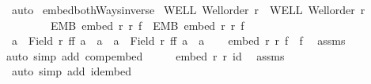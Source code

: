 \begin{isabellebody}
\ auto\isanewline
{}\isamarkupfalse%
%
\endisatagproof
{\isafoldproof}%
%
\isadelimproof
\isanewline
%
\endisadelimproof
\isanewline
{}\isamarkupfalse%
\ embed{\isacharunderscore}{\kern0pt}bothWays{\isacharunderscore}{\kern0pt}inverse{\isacharcolon}{\kern0pt}\isanewline
{}\ WELL{\isacharcolon}{\kern0pt}\ {\isachardoublequoteopen}Well{\isacharunderscore}{\kern0pt}order\ r{\isachardoublequoteclose}\ \ WELL{\isacharprime}{\kern0pt}{\isacharcolon}{\kern0pt}\ {\isachardoublequoteopen}Well{\isacharunderscore}{\kern0pt}order\ r{\isacharprime}{\kern0pt}{\isachardoublequoteclose}\ \isanewline
\ \ \ \ \ \ \ \ EMB{\isacharcolon}{\kern0pt}\ {\isachardoublequoteopen}embed\ r\ r{\isacharprime}{\kern0pt}\ f{\isachardoublequoteclose}\ \ EMB{\isacharprime}{\kern0pt}{\isacharcolon}{\kern0pt}\ {\isachardoublequoteopen}embed\ r{\isacharprime}{\kern0pt}\ r\ f{\isacharprime}{\kern0pt}{\isachardoublequoteclose}\isanewline
{}\ {\isachardoublequoteopen}{\isacharparenleft}{\kern0pt}{\isasymforall}a\ {\isasymin}\ Field\ r{\isachardot}{\kern0pt}\ f{\isacharprime}{\kern0pt}{\isacharparenleft}{\kern0pt}f\ a{\isacharparenright}{\kern0pt}\ {\isacharequal}{\kern0pt}\ a{\isacharparenright}{\kern0pt}\ {\isasymand}\ {\isacharparenleft}{\kern0pt}{\isasymforall}a{\isacharprime}{\kern0pt}\ {\isasymin}\ Field\ r{\isacharprime}{\kern0pt}{\isachardot}{\kern0pt}\ f{\isacharparenleft}{\kern0pt}f{\isacharprime}{\kern0pt}\ a{\isacharprime}{\kern0pt}{\isacharparenright}{\kern0pt}\ {\isacharequal}{\kern0pt}\ a{\isacharprime}{\kern0pt}{\isacharparenright}{\kern0pt}{\isachardoublequoteclose}\isanewline
%
\isadelimproof
%
\endisadelimproof
%
\isatagproof
{}\isamarkupfalse%
{\isacharminus}{\kern0pt}\isanewline
\ \ \isamarkupfalse%
\ {\isachardoublequoteopen}embed\ r\ r\ {\isacharparenleft}{\kern0pt}f{\isacharprime}{\kern0pt}\ {\isasymcirc}\ f{\isacharparenright}{\kern0pt}{\isachardoublequoteclose}\ \isamarkupfalse%
\ assms\isanewline
\ \ \isamarkupfalse%
{\isacharparenleft}{\kern0pt}auto\ simp\ add{\isacharcolon}{\kern0pt}\ comp{\isacharunderscore}{\kern0pt}embed{\isacharparenright}{\kern0pt}\isanewline
\ \ \isamarkupfalse%
\ \isamarkupfalse%
\ {\isachardoublequoteopen}embed\ r\ r\ id{\isachardoublequoteclose}\ \isamarkupfalse%
\ assms\isanewline
\ \ \isamarkupfalse%
\ {\isacharparenleft}{\kern0pt}auto\ simp\ add{\isacharcolon}{\kern0pt}\ id{\isacharunderscore}{\kern0pt}embed{\isacharparenright}{\kern0pt}\isanewline

\end{isabellebody}
